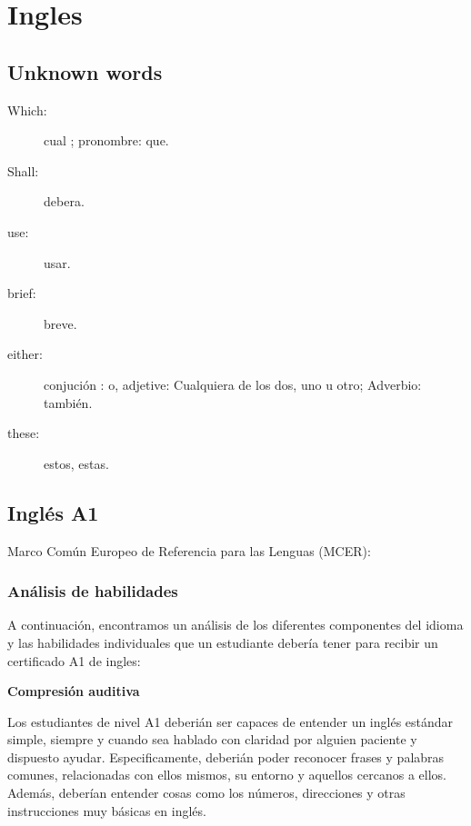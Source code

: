 \part{Ingles}

\chapter{ Unknown words }
\begin{description}
	\item[Which: ]  cual ; pronombre: que.
	\item[Shall: ]  debera.
	\item [use:  ]  usar.
	\item[brief: ]  breve.
	\item[either:]	conjuci\'on : o, adjetive: Cualquiera de los dos, uno u otro; Adverbio: tambi\'en.
	\item[these: ] estos, estas.

\end{description}

\chapter{Ingl\'es A1}

Marco Com\'un Europeo de Referencia para las Lenguas (MCER): 

\section{An\'alisis de habilidades}

A continuaci\'on, encontramos un an\'alisis de los diferentes componentes del idioma y las habilidades individuales que un estudiante deber\'ia tener para recibir un certificado A1 de ingles: 

{\bf Compresi\'on auditiva}

Los estudiantes de nivel A1 deberi\'an ser capaces de entender un ingl\'es est\'andar simple, siempre y cuando sea hablado con claridad por alguien paciente y dispuesto ayudar. Especificamente, deberi\'an poder reconocer frases y palabras comunes, relacionadas con ellos mismos, su entorno y aquellos cercanos a ellos. Adem\'as, deber\'ian entender cosas como los n\'umeros, direcciones y otras instrucciones muy b\'asicas en ingl\'es.

